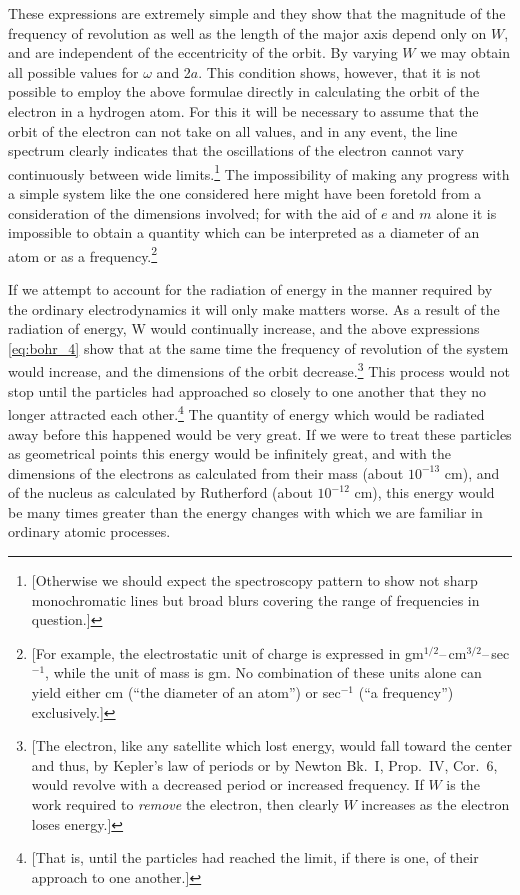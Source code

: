 These expressions are extremely simple and they show that the magnitude
of the frequency of revolution as well as the length of the major axis
depend only on $W$, and are independent of the eccentricity of the
orbit. By varying $W$ we may obtain all possible values for
$\omega$ and 2$a$. This condition shows, however, that it is not
possible to employ the above formulae directly in calculating the orbit
of the electron in a hydrogen atom. For this it will be necessary to
assume that the orbit of the electron can not take on all values, and in
any event, the line spectrum clearly indicates that the oscillations of
the electron cannot vary continuously between wide limits.\footnote{{[}Otherwise
  we should expect the spectroscopy pattern to show not sharp
  monochromatic lines but broad blurs covering the range of frequencies
  in question.{]}} The impossibility of making any progress with a
simple system like the one considered here might have been foretold from
a consideration of the dimensions involved; for with the aid of $e$
and $m$ alone it is impossible to obtain a quantity which can be
interpreted as a diameter of an atom or as a frequency.\footnote{{[}For
  example, the electrostatic unit of charge is expressed in
  gm$^{1/2}$--\,cm$^{3/2}$--\,sec$^{-1}$, while the unit of mass is
  gm. No combination of these units alone can yield either
  cm (``the diameter of an atom'') or sec$^{-1}$ (``a
  frequency'') exclusively.{]}}

If we attempt to account for the radiation of energy in the manner
required by the ordinary electrodynamics it will only make matters
worse. As a result of the radiation of energy, W would continually
increase, and the above expressions \eqref{eq:bohr_4} show that at the same time the
frequency of revolution of the system would increase, and the dimensions
of the orbit decrease.\footnote{{[}The electron, like any satellite
  which lost energy, would fall toward the center and thus, by Kepler's
  law of periods or by Newton Bk.\ I, Prop.\ IV, Cor.\ 6, would revolve with a decreased
  period or increased frequency. If $W$ is the work required to
  \emph{remove} the electron, then clearly $W$ increases as the
  electron loses energy.{]}} This process would not stop until the
particles had approached so closely to one another that they no longer
attracted each other.\footnote{{[}That is, until the particles had
  reached the limit, if there is one, of their approach to one
  another.{]}} The quantity of energy which would be radiated away
before this happened would be very great. If we were to treat these
particles as geometrical points this energy would be infinitely great,
and with the dimensions of the electrons as calculated from their mass
(about $10^{-13}$ cm), and of the nucleus as calculated by Rutherford (about
$10^{-12}$ cm), this energy would be many times greater than the energy
changes with which we are familiar in ordinary atomic processes.

